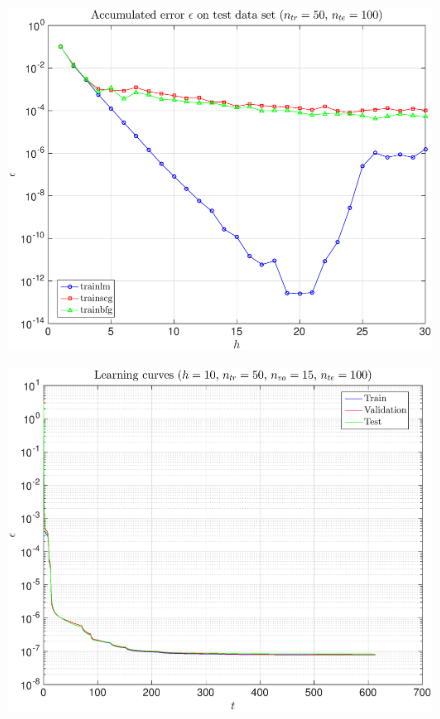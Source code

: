 \documentclass[11pt,a4paper]{article}
\theoremstyle{definition}
\theoremstyle{theorem}
\numberwithin{equation}{section}
\begin{document}
	\begin{figure}[H]
		\center
		\includegraphics[scale = 0.5]{fig28}
		\caption{}
	\end{figure}
	
	\begin{figure}[H]
		\center
		\includegraphics[scale = 0.5]{fig29}
		\caption{}
	\end{figure}
	
\end{document}
